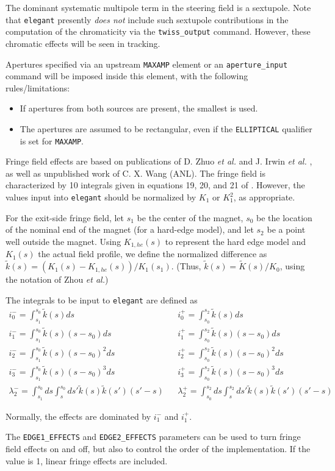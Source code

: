 The dominant systematic multipole term in the steering field is a
sextupole.  Note that {\tt elegant} presently {\em does not} include
such sextupole contributions in the computation of the chromaticity
via the {\tt twiss\_output} command.  However, these chromatic effects
will be seen in tracking.

Apertures specified via an upstream \verb|MAXAMP| element or an \verb|aperture_input|
command will be imposed inside this element, with the following rules/limitations:
\begin{itemize}
\item If apertures from both sources are present, the smallest is used.
\item The apertures are assumed to be rectangular, even if the \verb|ELLIPTICAL| qualifier
 is set for \verb|MAXAMP|.
\end{itemize}

Fringe field effects  are based on publications of D.  Zhuo {\em et al.} \cite{Zhou-IPAC10} and  J. Irwin {\em et
  al.} \cite{Irwin-PAC95}, as well as unpublished work of C. X. Wang (ANL).  The fringe field is characterized by 
10 integrals given in equations 19, 20, and 21 of \cite{Zhou-IPAC10}.  However, the values input into {\tt elegant}
should be normalized by $K_1$ or $K_1^2$, as appropriate.

For the exit-side fringe field, let $s_1$ be the center of the magnet, $s_0$ be the location of the nominal end of the magnet
(for a hard-edge model), and let $s_2$ be a point well outside the magnet.  
Using $K_{1,he}(s)$ to represent the hard edge model and $K_1(s)$ the actual field profile, we 
define the normalized difference as $\tilde{k}(s) = (K_1(s) - K_{1,he}(s))/K_1(s_1)$.  (Thus, $\tilde{k}(s) = \tilde{K}(s)/K_0$, using
the notation of Zhou {\em et al.})

The integrals to be input to {\tt elegant} are defined as 
\begin{eqnarray}
i_0^- = \int_{s_1}^{s_0} \tilde{k}(s) ds & & i_0^+ = \int_{s_0}^{s_2} \tilde{k}(s) ds \\
i_1^- = \int_{s_1}^{s_0} \tilde{k}(s) (s-s_0) ds & & i_1^+ = \int_{s_0}^{s_2} \tilde{k}(s) (s-s_0) ds \\
i_2^- = \int_{s_1}^{s_0} \tilde{k}(s) (s-s_0)^2 ds & & i_2^+ = \int_{s_0}^{s_2} \tilde{k}(s) (s-s_0)^2 ds \\
i_3^- = \int_{s_1}^{s_0} \tilde{k}(s) (s-s_0)^3 ds & & i_3^+ = \int_{s_0}^{s_2} \tilde{k}(s) (s-s_0)^3 ds \\
\lambda_2^- = \int_{s_1}^{s_0} ds \int_s^{s_0} ds\prime \tilde{k}(s) \tilde{k}(s\prime) (s\prime-s) & & 
\lambda_2^+ = \int_{s_0}^{s_2} ds \int_s^{s_2} ds\prime \tilde{k}(s) \tilde{k}(s\prime) (s\prime-s) 
\end{eqnarray}

Normally, the effects are dominated by $i_1^-$ and $i_1^+$.  

The \verb|EDGE1_EFFECTS| and \verb|EDGE2_EFFECTS| parameters can be used to turn fringe field effects on and off, but also
to control the order of the implementation.  If the value is 1, linear fringe effects are included.
